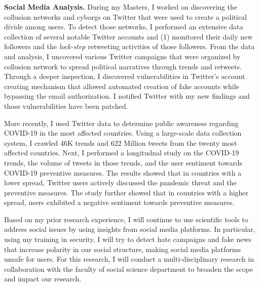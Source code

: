 \documentclass{NSF}
\newcommand{\BfPara}[1]{{\noindent\textbf{#1.}}\xspace}
\begin{document}
\BfPara{Social Media Analysis} During my Masters, I worked on discovering the collusion networks and cyborgs on Twitter that were used to create a political divide among users. To detect those networks, I performed an extensive data collection of several notable Twitter accounts and (1) monitored their daily new followers and the {\em lock-step} retweeting activities of those followers. From the data and analysis, I uncovered various Twitter campaigns that were organized by collusion network to spread political narratives through trends and retweets. Through a deeper inspection, I discovered vulnerabilities in Twitter's account creating mechanism that allowed automated creation of fake accounts while bypassing the email authorization. I notified Twitter with my new findings and those vulnerabilities have been patched.  

More recently, I used Twitter data to determine public awareness regarding COVID-19 in the most affected countries. Using a large-scale data collection system, I crawled 46K trends and 622 Million tweets from the twenty most affected countries. Next, I performed a longitudnal study on the COVID-19 trends, the volume of tweets in those trends, and the user sentiment towards COVID-19 preventive measures. The results showed that in countries with a lower spread, Twitter users actively discussed the pandemic threat and the preventive measures. The study further showed that in countries with a higher spread, users exhibited a negative sentiment towards preventive measures. 

Based on my prior research experience, I will continue to use scientific tools to address social issues by using insights from social media platforms. In particular, using my training in security, I will try to detect hate campaigns and fake news that increase polarity in our social structure, making social media platforms unsafe for users. For this research, I will conduct a multi-disciplinary research in collaboration with the faculty of social science department to broaden the scope and impact our research.  
\end{document}
